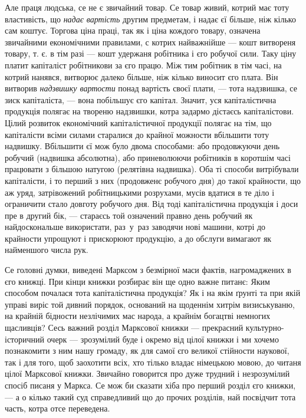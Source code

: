 Але праця людська, се не є звичайний товар. Се товар живий, котрий має тоту властивість, що \emph{надає вартість} другим предметам, і надає єї більше, ніж кілько сам коштує. Торгова ціна праці, так як і ціна кождого товару, означена звичайними економічними правилами, с котрих найважнійше — кошт витвореня товару, т. є. в тім разі — кошт удержаня робітника і єго робучої сили. Таку ціну платит капіталіст робітникови за єго працю. Між тим робітник в тім часі, на котрий нанявся, витворює далеко більше, ніж кілько виносит єго плата. Він витворив \emph{надзвишку вартости} понад вартість своєї плати, — тота надзвишка, се зиск капіталіста, — вона побільшує єго капітал. Значит, уся капіталістична продукція полягає на твореню надзвишки, котра задармо дістаєсь капіталістови. Цілий розвиток економічний капіталістичної продукції полягає на тім, що капіталісти всіми силами старалися до крайної можности вбільшити тоту надвишку. Вбільшити єї мож було двома способами: або продовжуючи день робучий (надвишка абсолютна), або приневолюючи робітників в коротшім часі працювати з більшою натугою (релятівна надвишка). Оба ті способи витрібували капіталісти, і то перший з них (продовженє робучого дня) до такої крайности, що аж уряд, затрівожений робітницькими розрухами, мусів вдатися в те діло і ограничити стало довготу робучого дня. Від тоді капіталістична продукція і доси пре в другий бік, — стараєсь той означений правно день робучий як найдоскональше використати, раз~у~раз заводячи нові машини, котрі до крайности упрощуют і прискорюют продукцію, а до обслуги вимагают як найменшого числа рук.

Се головні думки, виведені Марксом з безмірної маси фактів, нагромаджених в єго книжці. При кінци книжки розбирає він ще одно важне питанє: Яким способом почалася тота капіталістична продукція? Як і на якім ґрунті та при якій управі виріс той дивний порядок, оснований на щоденнім хитрім визиськуваню, на крайній бідности незлічимих мас народа, а крайнім богацтві немногих щасливців? Сесь важний розділ Марксової книжки — прекрасний культурно-історичний очерк — зрозумілий буде і окремо від цілої книжки і ми хочемо познакомити з ним нашу громаду, як для самої єго великої стійности наукової, так і для того, щоб заохотити всіх, хто тілько владає німецькою мовою, до читаня цілої Марксової книжки. Звичайно говорится про дуже трудний і незрозумілий спосіб писаня у Маркса. Се мож би сказати хіба про перший розділ єго книжки, — а о кілько такий суд справедливий що до прочих розділів, най посвідчит тота часть, котра отсе переведена.